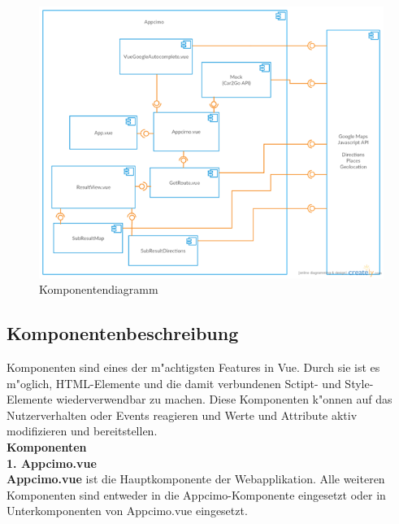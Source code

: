 \documentclass[a4paper, 11pt]{scrreprt}
\begin{document}
\begin{figure} [H]
\begin{center}
\includegraphics[scale=1]{komponentendiagramm.png}
\caption{Komponentendiagramm}
\label{Komponentendiagramm}
\end{center}
\end{figure}


\subsection{Komponentenbeschreibung}
Komponenten sind eines der m"achtigsten Features in Vue. Durch sie ist es m"oglich, HTML-Elemente und die damit verbundenen Sctipt- und Style-Elemente wiederverwendbar zu machen.  Diese Komponenten k"onnen auf das Nutzerverhalten oder Events reagieren und Werte und  Attribute aktiv modifizieren und bereitstellen.\\

\textbf{Komponenten} \\

\textbf{1. Appcimo.vue} \\

\textbf{Appcimo.vue} ist die Hauptkomponente der Webapplikation.  Alle weiteren Komponenten sind entweder in die Appcimo-Komponente eingesetzt oder in Unterkomponenten von Appcimo.vue eingesetzt.\\
\end{document}
